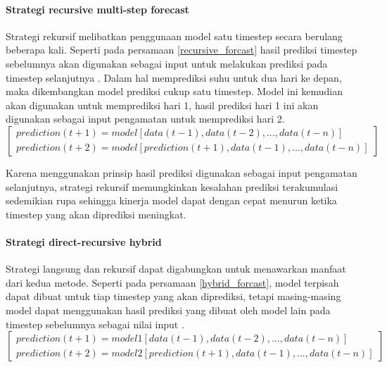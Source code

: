 \documentclass[../thesis.tex]{subfiles}
\begin{document}
\paragraph{Strategi recursive multi-step forecast} 

Strategi rekursif melibatkan penggunaan model satu timestep secara berulang beberapa kali. Seperti pada persamaan \ref{recursive_forcast} hasil prediksi timestep sebelumnya akan digunakan sebagai input untuk melakukan prediksi pada timestep selanjutnya \cite{Forecast_Strategy}.
Dalam hal memprediksi suhu untuk dua hari ke depan, maka dikembangkan model prediksi cukup satu timestep. Model ini kemudian akan digunakan untuk memprediksi hari 1, hasil prediksi hari 1 ini akan digunakan sebagai input pengamatan untuk memprediksi hari 2.
\begin{equation} \label{recursive_forcast}
\begin{bmatrix}
		prediction(t+1) = model[data(t-1), data(t-2), ..., data(t-n)]
		\\prediction(t+2) = model[prediction(t+1), data(t-1), ..., data(t-n)]
\end{bmatrix}
\end{equation}

Karena menggunakan prinsip hasil prediksi digunakan sebagai input pengamatan selanjutnya, strategi rekursif memungkinkan kesalahan prediksi terakumulasi sedemikian rupa sehingga kinerja model dapat dengan cepat menurun ketika timestep yang akan diprediksi meningkat.

\paragraph{Strategi direct-recursive hybrid} 

Strategi langsung dan rekursif dapat digabungkan untuk menawarkan manfaat dari kedua metode.
Seperti pada persamaan \ref{hybrid_forcast}, model terpisah dapat dibuat untuk tiap timestep yang akan diprediksi, tetapi masing-masing model dapat menggunakan hasil prediksi yang dibuat oleh model lain pada timestep sebelumnya sebagai nilai input \cite{Forecast_Strategy}.
\begin{equation} \label{hybrid_forcast}
\begin{bmatrix}
		prediction(t+1) = model1[data(t-1), data(t-2), ..., data(t-n)]
		\\prediction(t+2) = model2[prediction(t+1), data(t-1), ..., data(t-n)]
\end{bmatrix}
\end{equation}
\end{document}
